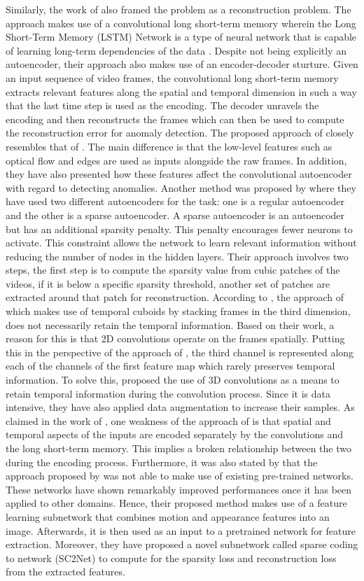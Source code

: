 Similarly, the work of  also framed the problem as a reconstruction problem. The approach makes use of a convolutional long short-term memory wherein the Long Short-Term Memory (LSTM) Network is a type of neural network that is capable of learning long-term dependencies of the data . Despite not being explicitly an autoencoder, their approach also makes use of an encoder-decoder sturture. Given an input sequence of video frames, the convolutional long short-term memory extracts relevant features along the spatial and temporal dimension in such a way that the last time step is used as the encoding. The decoder unravels the encoding and then reconstructs the frames which can then be used to compute the reconstruction error for anomaly detection.
The proposed approach of  closely resembles that of . The main difference is that the low-level features such as optical flow and edges are used as inputs alongside the raw frames. In addition, they have also presented how these features affect the convolutional autoencoder with regard to detecting anomalies.
Another method was proposed by  where they have used two different autoencoders for the task: one is a regular autoencoder and the other is a sparse autoencoder. A sparse autoencoder is an autoencoder but has an additional sparsity penalty. This penalty encourages fewer neurons to activate. This constraint allows the network to learn relevant information without reducing the number of nodes in the hidden layers. Their approach involves two steps, the first step is to compute the sparsity value from cubic patches of the videos, if it is below a specific sparsity threshold, another set of patches are extracted around that patch for reconstruction. 
According to , the approach of  which makes use of temporal cuboids by stacking frames in the third dimension, does not necessarily retain the temporal information. Based on their work, a reason for this is that 2D convolutions operate on the frames spatially. Putting this in the perspective of the approach of , the third channel is represented along each of the channels of the first feature map which rarely preserves temporal information. To solve this,  proposed the use of 3D convolutions as a means to retain temporal information during the convolution process. Since it is data intensive, they have also applied data augmentation to increase their samples.
As claimed in the work of  , one weakness of the approach of   is that spatial and temporal aspects of the inputs are encoded separately by the convolutions and the long short-term memory. This implies a broken relationship between the two during the encoding process. Furthermore, it was also stated by  that the approach proposed by  was not able to make use of existing pre-trained networks. These networks have shown remarkably improved performances once it has been applied to other domains. Hence, their proposed method makes use of a feature learning subnetwork that combines motion and appearance features into an image. Afterwards, it is then used as an input to a pretrained network for feature extraction. Moreover, they have proposed a novel subnetwork called sparse coding to network (SC2Net) to compute for the sparsity loss and reconstruction loss from the extracted features.
